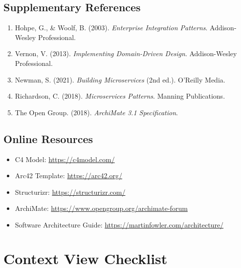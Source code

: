 \documentclass[11pt,letterpaper]{article}
\begin{document}
\subsection{Supplementary References}

\begin{enumerate}[resume]
    \item Hohpe, G., \& Woolf, B. (2003). \textit{Enterprise Integration Patterns}. Addison-Wesley Professional.
    
    \item Vernon, V. (2013). \textit{Implementing Domain-Driven Design}. Addison-Wesley Professional.
    
    \item Newman, S. (2021). \textit{Building Microservices} (2nd ed.). O'Reilly Media.
    
    \item Richardson, C. (2018). \textit{Microservices Patterns}. Manning Publications.
    
    \item The Open Group. (2018). \textit{ArchiMate 3.1 Specification}.
\end{enumerate}

\subsection{Online Resources}

\begin{itemize}
    \item C4 Model: \url{https://c4model.com/}
    \item Arc42 Template: \url{https://arc42.org/}
    \item Structurizr: \url{https://structurizr.com/}
    \item ArchiMate: \url{https://www.opengroup.org/archimate-forum}
    \item Software Architecture Guide: \url{https://martinfowler.com/architecture/}
\end{itemize}

\appendix

\section{Context View Checklist}
\end{document}
